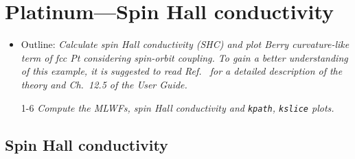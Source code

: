 \section{Platinum---Spin Hall conductivity}
\label{sec29:PtSHC}

\begin{itemize}
	\item Outline: {\it Calculate spin Hall conductivity (SHC) and
			plot Berry curvature-like term
			of fcc Pt considering spin-orbit coupling.
			To gain a better understanding of this example,
			it is suggested to read Ref.~ for a detailed
			description of the theory and Ch.~12.5 of the User Guide.}
\end{itemize}

\begin{itemize}
	\item[1-6] {\it Compute the MLWFs, spin Hall conductivity and
		{\tt kpath}, {\tt kslice} plots.}
\end{itemize}

\subsection*{Spin Hall conductivity}

